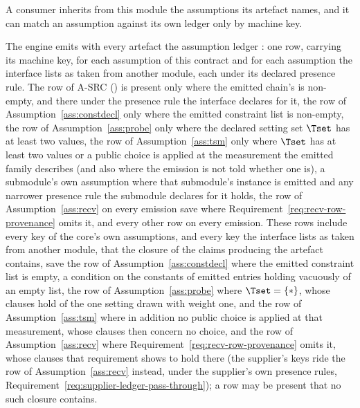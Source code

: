 
A consumer inherits from this module the assumptions its artefact names, and
it can match an assumption against its own ledger only by machine key.

\begin{requirement}\label{req:assumption-ledger}
The engine emits with every artefact the assumption ledger
: one row, carrying its machine key, for each
assumption of this contract and for each assumption the interface lists as
taken from another module, each under its declared presence rule. The row
of A-SRC () is present only where the emitted chain's
 is non-empty, and there under the presence rule the
interface declares for it, the row of Assumption~\ref{ass:constdecl} only
where the emitted constraint list is non-empty, the row of
Assumption~\ref{ass:probe} only where the declared setting set $\Tset$ has
at least two values, the row of Assumption~\ref{ass:tsm} only where $\Tset$
has at least two values or a public choice is applied at the measurement the
emitted family describes (and also where the emission is not told whether
one is), a submodule's own assumption
where that submodule's instance is emitted and any narrower presence rule the
submodule declares for it holds, the row of Assumption~\ref{ass:recv} on
every emission save where Requirement~\ref{req:recv-row-provenance} omits
it, and every other row on every emission.
These rows include every key
of the core's own assumptions, and every key the interface lists as taken
from another module, that the closure of the claims producing the artefact
contains, save the row of Assumption~\ref{ass:constdecl} where the emitted
constraint list is empty, a condition on the constants of emitted entries
holding vacuously of an empty list, the row of Assumption~\ref{ass:probe}
where $\Tset=\{\ast\}$, whose clauses hold of the one setting drawn with
weight one, and the row of Assumption~\ref{ass:tsm} where in addition no
public choice is applied at that measurement, whose clauses then concern no
choice, and the row of Assumption~\ref{ass:recv} where
Requirement~\ref{req:recv-row-provenance} omits it, whose clauses that
requirement shows to hold there (the supplier's keys ride the row of
Assumption~\ref{ass:recv}
instead, under the supplier's own presence rules,
Requirement~\ref{req:supplier-ledger-pass-through}); a row may be present that
no such closure contains.
\end{requirement}
